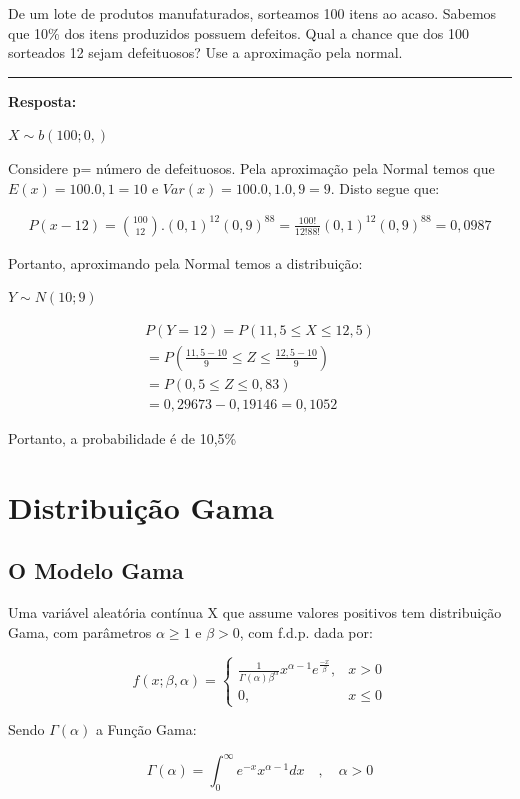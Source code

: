 \documentclass[
  letterpaper,
  DIV=11,
  numbers=noendperiod]{scrartcl}
\begin{document}
\begin{exemplo}

De um lote de produtos manufaturados, sorteamos 100 itens ao acaso.
Sabemos que 10\% dos itens produzidos possuem defeitos. Qual a chance
que dos 100 sorteados 12 sejam defeituosos? Use a aproximação pela
normal.

\begin{center}\rule{0.5\linewidth}{0.5pt}\end{center}

\textbf{Resposta:}

\(X \sim b(100;0,)\)

Considere p= número de defeituosos. Pela aproximação pela Normal temos
que \(E (x)=100.0,1=10\) e \(Var(x)=100. 0,1 . 0,9 =9\). Disto segue
que:

\[\begin{array}{ccc}
P(x-12)=\binom{100}{12}. (0,1)^{12} (0,9)^{88}
=\frac{100!}{12! 88!}(0,1)^{12} (0,9)^{88}= 0,0987
\end{array}\]

Portanto, aproximando pela Normal temos a distribuição:

\(Y \sim N(10;9)\)

\[\begin{array}{ccc}
P(Y=12)=P(11,5 \leq X \leq 12,5)
\\
=P(\frac{11,5-10}{9}\leq Z \leq \frac{12,5-10}{9})
\\
=P(0,5 \leq Z \leq 0,83) 
\\
=0,29673-0,19146=0,1052
\end{array}\]

Portanto, a probabilidade é de 10,5\%

\end{exemplo}

\section{Distribuição Gama}\label{distribuiuxe7uxe3o-gama}

\subsection{O Modelo Gama}\label{o-modelo-gama}

Uma variável aleatória contínua X que assume valores positivos tem
distribuição Gama, com parâmetros \(\alpha \geq 1\) e \(\beta>0\), com
f.d.p. dada por:

\begin{definicao}

\[
f(x;\beta,\alpha) = \begin{cases} 
\frac{1}{\Gamma(\alpha)\beta^{\alpha}}x^{\alpha -1} e^{\frac{-x}{\beta}}, & x > 0 \\ 
0, & x \leq 0 
\end{cases}
\]

Sendo \(\Gamma(\alpha)\) a Função Gama:

\[
\Gamma(\alpha) = \int_{0}^{\infty} e^{-x}x^{\alpha-1}dx \quad , \quad \alpha > 0
\]

\end{definicao}
\end{document}
